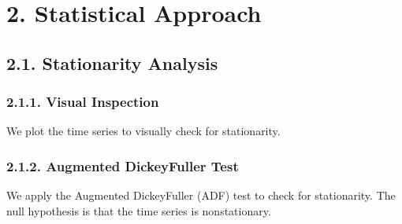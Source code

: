 \documentclass[letterpaper,10pt,english]{sphinxmanual}
\begin{document}
\begin{sphinxVerbatim}[commandchars=\\\{\}]
    
  
\PYG{p}{[}\PYG{p}{]}    \PYG{p}{[}\PYG{p}{]} 
\end{sphinxVerbatim}


\section{2. Statistical Approach}
\label{\detokenize{index:statistical-approach}}

\subsection{2.1. Stationarity Analysis}
\label{\detokenize{index:stationarity-analysis}}

\subsubsection{2.1.1. Visual Inspection}
\label{\detokenize{index:visual-inspection}}
\sphinxAtStartPar
We plot the time series to visually check for stationarity.



\subsubsection{2.1.2. Augmented Dickey\sphinxhyphen{}Fuller Test}
\label{\detokenize{index:augmented-dickey-fuller-test}}
\sphinxAtStartPar
We apply the Augmented Dickey\sphinxhyphen{}Fuller (ADF) test to check for stationarity. The null hypothesis is that the time series is non\sphinxhyphen{}stationary.
\end{document}
